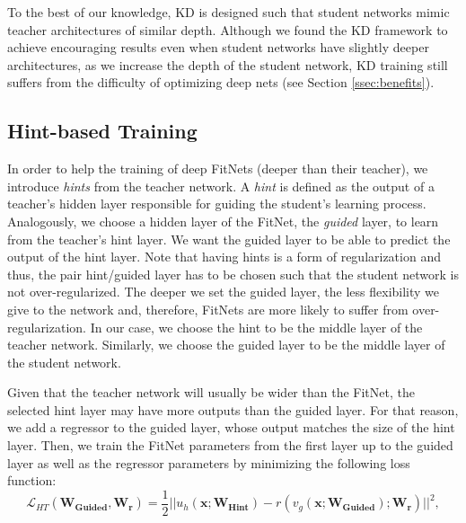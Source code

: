 \documentclass{article} %
\begin{document}
To the best of our knowledge, KD is designed such that student networks mimic
teacher architectures of similar depth. Although we found the KD framework to achieve
encouraging results even when student networks have slightly deeper
architectures, as we increase the depth of the student network, KD training
still suffers from the difficulty of optimizing deep nets
(see Section \ref{ssec:benefits}).

\vspace*{-1mm}
\subsection{Hint-based Training}
\vspace*{-1mm}

In order to help the training of deep FitNets (deeper than their teacher), we
introduce \textit{hints} from the teacher network. A \textit{hint} is defined
as the output of a teacher's hidden layer responsible for guiding the
student's learning process.  Analogously, we choose a hidden
layer of the FitNet, the \textit{guided} layer, to learn from the teacher's hint layer. We want
the guided layer to be able to predict the output of the hint layer. Note that having
hints is a form of regularization and thus, the pair hint/guided layer has to be
chosen such that the student network is not over-regularized. The deeper we set the guided layer, the less flexibility we give to the network and, therefore, FitNets are more likely to suffer from over-regularization. In our case, we
choose the hint to be the middle layer of the teacher
network. Similarly, we choose the guided layer to be the middle layer
of the student network. 

Given that the teacher network will usually be wider than the FitNet,
the selected hint layer may have more outputs than the guided layer. For that
reason, we add a regressor to the guided layer, whose output matches the size of the
hint layer. Then, we train the FitNet parameters from the first layer up to
the guided layer as well as the regressor parameters by minimizing the
following loss function:
\begin{equation}
\mathcal{L}_{HT}(\mathbf{W_{Guided}},\mathbf{W_r}) = \frac{1}{2} || u_{h}(\mathbf{x};\mathbf{W_{Hint}}) - r(v_{g}(\mathbf{x};\mathbf{W_{Guided}});\mathbf{W_r}) ||^2,
\label{eq:hints}
\end{equation}
\end{document}
